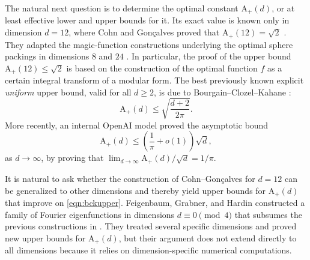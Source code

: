 \documentclass[10pt,reqno]{amsproc}
\newcommand{\rA}{\mathrm{A}}
\newcommand{\1}{\mathds{1}}	%
\theoremstyle{definition}
\theoremstyle{remark}
\begin{document}
The natural next question is to determine the optimal constant $\rA_+(d)$, or at least effective lower and upper bounds for it.
Its exact value is known only in dimension $d = 12$, where Cohn and Gon{\c{c}}alves proved that $\rA_+(12) = \sqrt{2}$ \cite{cohn2019optimal}.
They adapted the magic-function constructions underlying the optimal sphere packings in dimensions $8$ and $24$ \cite{viazovska2017sphere,cohn2017sphere}.
In particular, the proof of the upper bound $\rA_+(12) \le \sqrt{2}$ is based on the construction of the optimal function $f$ as a certain integral transform of a modular form.
The best previously known explicit \emph{uniform} upper bound, valid for all $d \ge 2$, is due to Bourgain--Clozel--Kahane \cite{bourgain2010principe}:
\begin{equation}
    \label{eqn:bckupper}
    \rA_+(d) \le \sqrt{\frac{d + 2}{2\pi}}.
\end{equation}
More recently, an internal OpenAI model proved the asymptotic bound \cite[Chapter 1, Theorem 1.2]{openai10}
\begin{equation}
    \label{eqn:Apos_limit}
    \rA_{+}(d) \le \left(\frac{1}{\pi} + o(1)\right) \sqrt{d},
\end{equation}
as $d \to \infty$, by proving that $\lim_{d \to \infty} \rA_{+}(d)/\sqrt{d} = 1/\pi$.

It is natural to ask whether the construction of Cohn--Gon{\c{c}}alves for $d = 12$ can be generalized to other dimensions and thereby yield upper bounds for $\rA_+(d)$ that improve on \eqref{eqn:bckupper}.
Feigenbaum, Grabner, and Hardin \cite{feigenbaum2021eigenfunctions} constructed a family of Fourier eigenfunctions in dimensions $d \equiv 0 \pmod{4}$ that subsumes the previous constructions in \cite{viazovska2017sphere,cohn2017sphere,cohn2019optimal}.
They treated several specific dimensions and proved new upper bounds for $\rA_+(d)$, but their argument does not extend directly to all dimensions because it relies on dimension-specific numerical computations.
\end{document}
